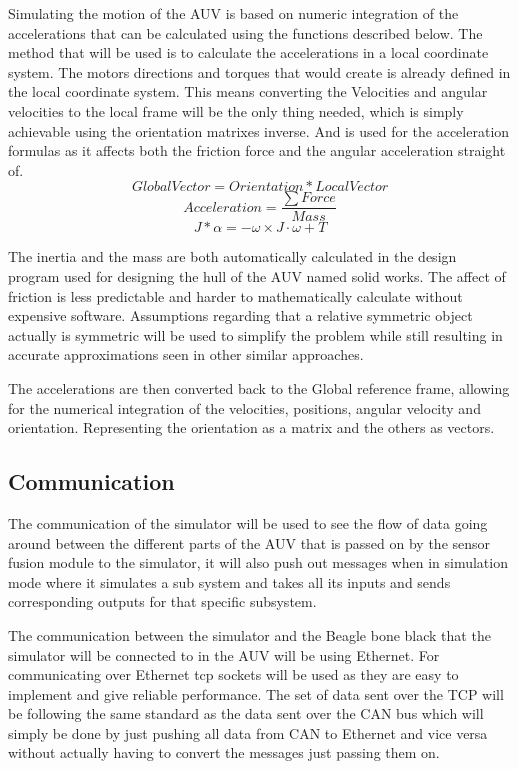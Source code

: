 Simulating the motion of the AUV is based on numeric integration of the accelerations that can be calculated using the functions described below. The method that will be used is to calculate the accelerations in a local coordinate system. The motors directions and torques that would create is already defined in the local coordinate system. This means converting the Velocities and angular velocities to the local frame will be the only thing needed, which is simply achievable using the orientation matrixes inverse. And is used for the acceleration formulas as it affects both the friction force and the angular acceleration straight of.
\begin{equation}
Global Vector = Orientation*Local Vector
\end{equation}
\begin{equation}
Acceleration = \frac{\sum Force}{Mass}
\end{equation}
\begin{equation}
J*\alpha = - \omega \times J \cdot\omega + T 
\end{equation}

The inertia and the mass are both automatically calculated in the design program used for designing the hull of the AUV named solid works. The affect of friction is less predictable and harder to mathematically calculate without expensive software. Assumptions regarding that a relative symmetric object actually is symmetric will be used to simplify the problem while still resulting in accurate approximations seen in other similar approaches.

The accelerations are then converted back to the Global reference frame, allowing for the numerical integration of the velocities, positions, angular velocity and orientation. Representing the orientation as a matrix and the others as vectors.
\subsection{Communication}

The communication of the simulator will be used to see the flow of data going around between the different parts of the AUV that is passed on by the sensor fusion module to the simulator, it will also push out messages when in simulation mode where it simulates a sub system and takes all its inputs and sends corresponding outputs for that specific subsystem.

The communication between the simulator and the Beagle bone black that the simulator will be connected to in the AUV will be using Ethernet. For communicating over Ethernet tcp sockets will be used as they are easy to implement and give reliable performance. The set of data sent over the TCP will be following the same standard as the data sent over the CAN bus which will simply be done by just pushing all data from CAN to Ethernet and vice versa without actually having to convert the messages just passing them on.


